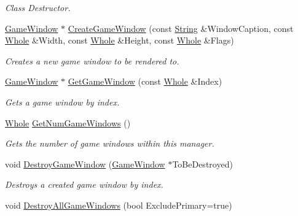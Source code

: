 \begin{DoxyCompactItemize}
\begin{DoxyCompactList}\small\item\em Class Destructor. \item\end{DoxyCompactList}\item 
\hyperlink{classphys_1_1GameWindow}{GameWindow} $\ast$ \hyperlink{classphys_1_1GraphicsManager_a31c4d90e4ee016b96b7f4e78e20d87a0}{CreateGameWindow} (const \hyperlink{namespacephys_aa03900411993de7fbfec4789bc1d392e}{String} \&WindowCaption, const \hyperlink{namespacephys_a460f6bc24c8dd347b05e0366ae34f34a}{Whole} \&Width, const \hyperlink{namespacephys_a460f6bc24c8dd347b05e0366ae34f34a}{Whole} \&Height, const \hyperlink{namespacephys_a460f6bc24c8dd347b05e0366ae34f34a}{Whole} \&Flags)
\begin{DoxyCompactList}\small\item\em Creates a new game window to be rendered to. \item\end{DoxyCompactList}\item 
\hyperlink{classphys_1_1GameWindow}{GameWindow} $\ast$ \hyperlink{classphys_1_1GraphicsManager_a94952747ba141966fb138101b10864ee}{GetGameWindow} (const \hyperlink{namespacephys_a460f6bc24c8dd347b05e0366ae34f34a}{Whole} \&Index)
\begin{DoxyCompactList}\small\item\em Gets a game window by index. \item\end{DoxyCompactList}\item 
\hyperlink{namespacephys_a460f6bc24c8dd347b05e0366ae34f34a}{Whole} \hyperlink{classphys_1_1GraphicsManager_ae54cf5861681ef6b1849b35bfaa55bb6}{GetNumGameWindows} ()
\begin{DoxyCompactList}\small\item\em Gets the number of game windows within this manager. \item\end{DoxyCompactList}\item 
void \hyperlink{classphys_1_1GraphicsManager_a814eb66a4da0075dc8f46199a4716241}{DestroyGameWindow} (\hyperlink{classphys_1_1GameWindow}{GameWindow} $\ast$ToBeDestroyed)
\begin{DoxyCompactList}\small\item\em Destroys a created game window by index. \item\end{DoxyCompactList}\item 
void \hyperlink{classphys_1_1GraphicsManager_a2824743d519bcc98abe5c95d0180c73c}{DestroyAllGameWindows} (bool ExcludePrimary=true)

\end{DoxyCompactItemize}
